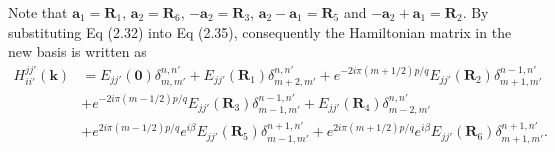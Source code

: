 \documentclass{report}
\begin{document}
Note that $\mathbf{a}_{1} = \mathbf{R}_{1}$, $\mathbf{a}_{2} = \mathbf{R}_{6}$, $-\mathbf{a}_{2} = \mathbf{R}_{3}$, $\mathbf{a}_{2} - \mathbf{a}_{1} = \mathbf{R}_{5}$ and $-\mathbf{a}_{2}+\mathbf{a}_{1} = \mathbf{R}_{2}$.
By substituting Eq (2.32) into Eq (2.35), consequently the Hamiltonian matrix in the new basis is written as
\begin{equation}
	\begin{aligned}
		H_{ii'}^{jj'}(\mathbf{k})
		 & = E_{jj'}(\mathbf{0}) \delta_{m,m'}^{n,n'} + E_{jj'}(\mathbf{R}_{1}) \delta_{m+2,m'}^{n,n'} + e^{-2i\pi(m + 1/2)p / q} E_{jj'}(\mathbf{R}_{2}) \delta_{m+1,m'}^{n-1,n'}      \\
		 & + e^{-2i\pi(m - 1/2)p / q} E_{jj'}(\mathbf{R}_{3}) \delta_{m-1,m'}^{n-1,n'} + E_{jj'}(\mathbf{R}_{4})  \delta_{m-2,m'}^{n,n'}                                                \\
		 & + e^{2i\pi(m - 1/2)p / q} e^{i\beta} E_{jj'}(\mathbf{R}_{5}) \delta_{m-1,m'}^{n+1,n'} + e^{2i\pi(m + 1/2)p / q} e^{i\beta} E_{jj'}(\mathbf{R}_{6}) \delta_{m+1,m'}^{n+1,n'}.
	\end{aligned}
\end{equation}
\end{document}
